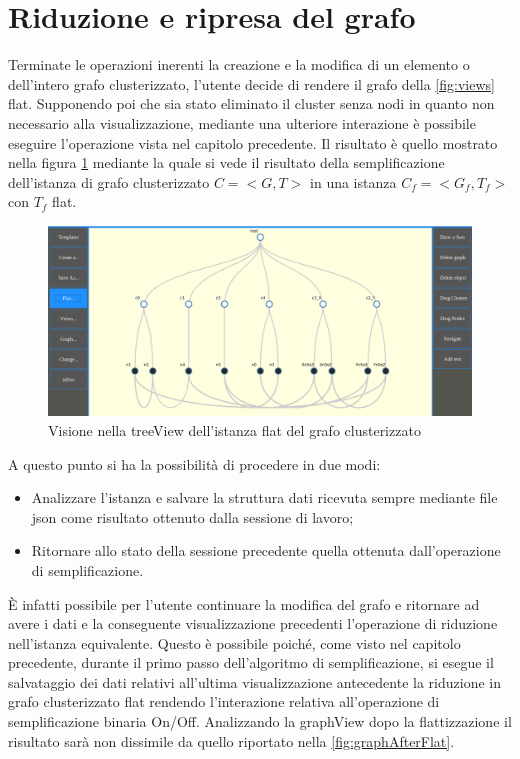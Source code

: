 {\section{Riduzione e ripresa del grafo}
Terminate le operazioni inerenti la creazione e la modifica di un elemento o dell'intero grafo clusterizzato, l'utente decide di rendere il grafo della \figurename{\ref{fig:views}} flat. Supponendo poi che sia stato eliminato il cluster senza nodi in quanto non necessario alla visualizzazione, mediante una ulteriore interazione è possibile eseguire l'operazione vista nel capitolo precedente. Il risultato è quello mostrato nella figura \figurename{\ref{fig:treeAfterFlat}} mediante la quale si vede il risultato della semplificazione dell'istanza di grafo clusterizzato $C=<G,T>$ in una istanza $C_f=<G_f,T_f>$ con $T_f$ flat.
\begin{figure}[!htb]
	\begin{center}
		\includegraphics[width=0.8 \linewidth]{figure/treeAfterFlat}
	\end{center}
	\caption{Visione nella treeView dell'istanza flat del grafo clusterizzato\label{fig:treeAfterFlat}}
\end{figure}
A questo punto si ha la possibilità di procedere in due modi:
\begin{itemize}
	\item Analizzare l'istanza e salvare la struttura dati ricevuta sempre mediante file json come risultato ottenuto dalla sessione di lavoro;
	\item Ritornare allo stato della sessione precedente quella ottenuta dall'operazione di semplificazione.
\end{itemize}

È infatti possibile per l'utente continuare la modifica del grafo e ritornare ad avere i dati e la conseguente visualizzazione precedenti l'operazione di riduzione nell'istanza equivalente. Questo è possibile poiché, come visto nel capitolo precedente, durante il primo passo dell'algoritmo di semplificazione, si esegue il salvataggio dei dati relativi all'ultima visualizzazione antecedente la riduzione in grafo clusterizzato flat rendendo l'interazione relativa all'operazione di semplificazione binaria On/Off. Analizzando la graphView dopo la flattizzazione il risultato sarà non dissimile da quello riportato nella \figurename{\ref{fig:graphAfterFlat}}.

}
